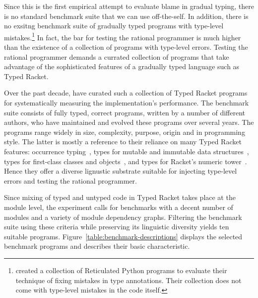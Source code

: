 
Since this is the first empirical attempt to evaluate blame in gradual typing,
there is no standard benchmark suite that we can use off-the-self.  In addition,
there is no exsitng benchmark suite of gradually typed programs with type-level
mistakes.\footnote{\citet{cc-oopsla-20} created a collection of Reticulated
Python programs to evaluate their technique of fixing mistakes in type
annotations. Their collection does not come with type-level mistakes in the code
itself.} In fact, the bar for testing the rational programmer is much higher
than the existence of a collection of programs with type-level errors. Testing
the rational programmer demands a currated collection of programs that take
advantage of the sophisticated features of a gradually typed language such as
Typed Racket.

Over the past decade,  \citet{gtnffvf-jfp-2019} have curated such a
collection of Typed Racket programs for systematically measuring the
implementation's performance. The benchmark suite consists of fully typed,
correct programs, written by a number of different authors, who have
maintained and evolved these programs over several years. The programs
range widely in size, complexity, purpose, origin and in programming
style. The latter is mostly a reference to their reliance on many Typed
Racket features: occurrence typing~\cite{tf-icfp-2010}, types for mutable
and immutable data structures~\cite{hpst-sfp-2010}, types for first-class
classes and objects~\cite{tsdtf-oopsla-2012}, and types for Racket's
numeric tower~\cite{stathff-padl-12}. Hence they offer a diverse lignustic
substrate suitable for injecting type-level errors and testing the
rational programmer. 

Since mixing of typed and untyped code in Typed Racket takes place at the
module level, the experiment calls for benchmarks with a decent number of
modules and a variety of module dependency graphs. Filtering the benchmark
suite using these criteria while preserving its linguistic diversity
yields ten suitable programs. Figure~\ref{table:benchmark-descriptions}
displays the selected benchmark programs and describes their basic
characteristic. 
